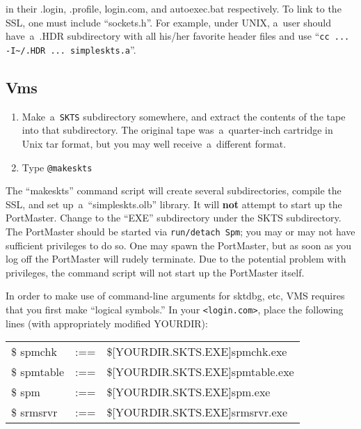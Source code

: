\documentclass[12pt]{article}
\def\SSL{{\small SSL}}
\begin{document}
\noindent
in their .login, .profile, login.com, and autoexec.bat respectively.  To link
to the \SSL, one must include ``sockets.h''.  For example, under {\small UNIX},
a~user should have~a~{\small .HDR} subdirectory with all his/her favorite
header files and use ``\verb`cc ...  -I~/.HDR ... simpleskts.a`''.


\subsection{Vms}

\begin{enumerate}

  \item Make~a~{\tt SKTS} subdirectory somewhere, and extract the contents
   of the tape into that subdirectory.  The original tape was~a~quarter-inch
   cartridge in Unix tar format, but you may well receive~a~different format.

  \item Type \verb`@makeskts`
\end{enumerate}

The ``makeskts'' command script will create several subdirectories, compile the
\SSL, and set up~a~``simpleskts.olb'' library.  It will {\bf not} attempt to
start up the PortMaster.  Change to the ``{\small EXE}'' subdirectory under the
{\small SKTS} subdirectory.  The PortMaster should be started via
\verb`run/detach Spm`; you may or may not have sufficient privileges to do so.
One may spawn the PortMaster, but as soon as you log off the PortMaster will
rudely terminate.  Due to the potential problem with privileges, the command
script will not start up the PortMaster itself.

In order to make use of command-line arguments for sktdbg, etc, {\small VMS} requires
that you first make ``logical symbols.''  In your \verb`<login.com>`,
place the following lines (with appropriately modified {\small YOURDIR}):

 \begin{center}
  \begin{tabular}{lcl}
  \$ spmchk   & :== & \$[{\small YOURDIR.SKTS.EXE}]spmchk.exe   \\
  \$ spmtable & :== & \$[{\small YOURDIR.SKTS.EXE}]spmtable.exe \\
  \$ spm      & :== & \$[{\small YOURDIR.SKTS.EXE}]spm.exe      \\
  \$ srmsrvr  & :== & \$[{\small YOURDIR.SKTS.EXE}]srmsrvr.exe
  \end{tabular}
 \end{center}
\end{document}
